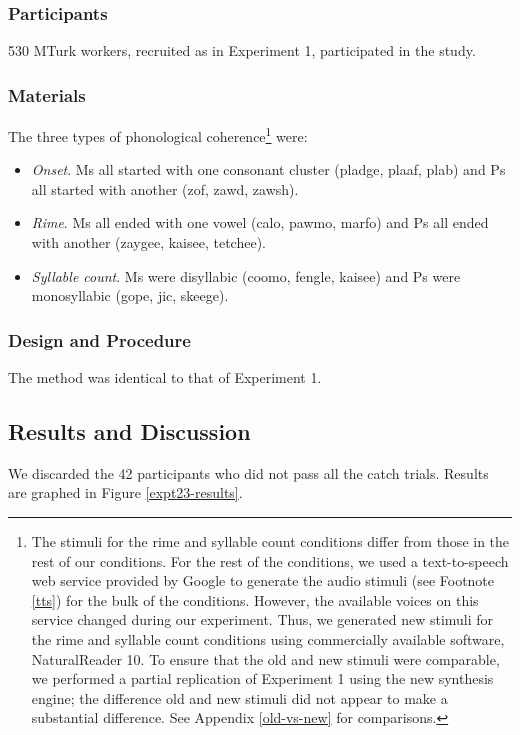 \documentclass[man,floatsintext]{apa6}
\begin{document}
\subsubsection{Participants} 
530 MTurk workers, recruited as in Experiment 1, participated in the study.

\subsubsection{Materials}
The three types of phonological coherence\footnote{\label{change-of-stimuli} The stimuli for the rime and syllable count conditions differ from those in the rest of our conditions. For the rest of the conditions, we used a text-to-speech web service provided by Google to generate the audio stimuli (see Footnote \ref{tts}) for the bulk of the conditions. However, the available voices on this service changed during our experiment. Thus, we generated new stimuli for the rime and syllable count conditions using commercially available software, NaturalReader 10. To ensure that the old and new stimuli were comparable, we performed a partial replication of Experiment 1 using the new synthesis engine; the difference old and new stimuli did not appear to make a substantial difference. See Appendix \ref{old-vs-new} for comparisons.} were:

\begin{itemize}
\item \emph{Onset}. Ms all started with one consonant cluster (pladge, plaaf, plab) and Ps all started with another (zof, zawd, zawsh).
\item \emph{Rime}. Ms all ended with one vowel (calo, pawmo, marfo) and Ps all ended with another (zaygee, kaisee, tetchee).
\item \emph{Syllable count}. Ms were disyllabic (coomo, fengle, kaisee) and Ps were monosyllabic (gope, jic, skeege).
\end{itemize}

\subsubsection{Design and Procedure}
The method was identical to that of Experiment 1.

\subsection{Results and Discussion}

We discarded the 42 participants who did not pass all the catch trials. Results are graphed in Figure \ref{expt23-results}.
\end{document}
